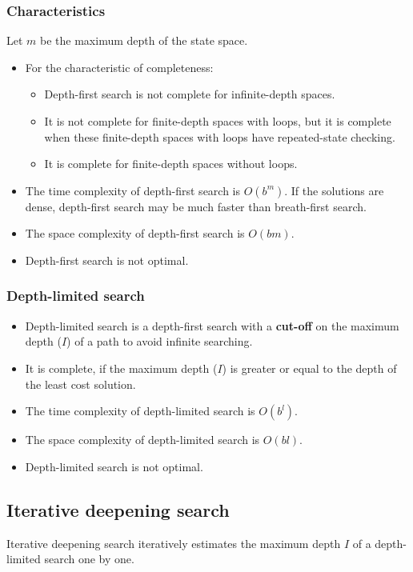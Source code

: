\documentclass[11pt]{article}
\begin{document}
\subsubsection{Characteristics}
\label{sec:orge263e41}
Let \(m\) be the maximum depth of the state space.
\begin{itemize}
\item For the characteristic of completeness:
\begin{itemize}
\item Depth-first search is not complete for infinite-depth spaces.
\item It is not complete for finite-depth spaces with loops, but it is complete when these finite-depth spaces with loops have repeated-state checking.
\item It is complete for finite-depth spaces without loops.
\end{itemize}
\item The time complexity of depth-first search is \(O(b^m)\). If the solutions are dense, depth-first search may be much faster than breath-first search.
\item The space complexity of depth-first search is \(O(bm)\).
\item Depth-first search is not optimal.
\end{itemize}

 \newpage
\subsubsection{Depth-limited search}
\label{sec:orgd5d8ae9}
\begin{itemize}
\item Depth-limited search is a depth-first search with a \textbf{cut-off} on the maximum depth (\(I\)) of a path to avoid infinite searching.
\item It is complete, if the maximum depth (\(I\)) is greater or equal to the depth of the least cost solution.
\item The time complexity of depth-limited search is \(O(b^l)\).
\item The space complexity of depth-limited search is \(O(bl)\).
\item Depth-limited search is not optimal.
\end{itemize}

 \newpage
\subsection{Iterative deepening search}
\label{sec:org22a17b8}
Iterative deepening search iteratively estimates the maximum depth \(I\) of a depth-limited search one by one.
\end{document}
